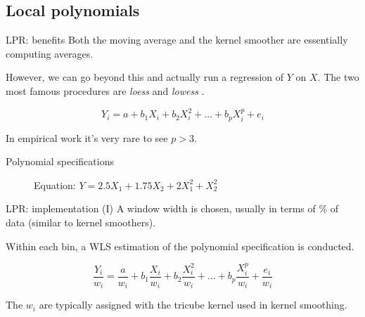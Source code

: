 \documentclass[12pt,english,pdf,xcolor=dvipsnames,aspectratio=169,handout]{beamer}\usepackage[]{graphicx}\usepackage[]{xcolor}
\begin{document}
\subsection{Local polynomials}
\begin{frame}{LPR: benefits}
  Both the moving average and the kernel smoother are essentially computing averages.\bigskip

  However, we can go beyond this and actually run a regression of $Y$ on $X$. The two most famous procedures are \textit{loess} and \textit{lowess} \cite{cleveland1979}.

  \begin{equation}
    Y_i = a + b_1X_i + b_2X_i^2 + \dots + b_pX_i^p + e_i
  \end{equation}

  In empirical work it's very rare to see $p>3$.
\end{frame}


\begin{frame}{Polynomial specifications}

\begin{figure}
\centering
{}
\caption*{Equation: $Y = 2.5X_1 + 1.75X_2 + 2X_1^2 + X_2^2$}
\end{figure}

\end{frame}


\begin{frame}{LPR: implementation (I)}
  A window width is chosen, usually in terms of \% of data (similar to kernel smoothers).\bigskip

  Within each bin, a WLS estimation of the polynomial specification is conducted.

  \begin{equation}
    \frac{Y_i}{w_i} = \frac{a}{w_i} + b_1\frac{X_i}{w_i} + b_2\frac{X_i^2}{w_i} + \dots + b_p\frac{X_i^p}{w_i} + \frac{e_i}{w_i}
    \label{eq:eq-01}
  \end{equation}

  The $w_i$ are typically assigned with the tricube kernel used in kernel smoothing.
\end{frame}
\end{document}
